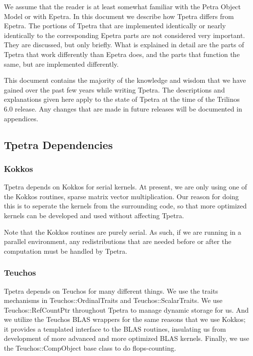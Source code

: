 \documentclass[10pt,relax]{TpetraDesign}
\begin{document}
We assume that the reader is at least somewhat familiar with the Petra Object Model or with Epetra. In this document we describe how Tpetra differs from Epetra. The portions of Tpetra that are implemented identically or nearly identically to the corresponding Epetra parts are not considered very important. They are discussed, but only briefly. What is explained in detail are the parts of Tpetra that work differently than Epetra does, and the parts that function the same, but are implemented differently.

This document contains the majority of the knowledge and wisdom that we have gained over the past few years while writing Tpetra. The descriptions and explanations given here apply to the state of Tpetra at the time of the Trilinos 6.0 release. Any changes that are made in future releases will be documented in appendices.

%
\subsection{Tpetra Dependencies}

\subsubsection*{Kokkos}
Tpetra depends on Kokkos \cite{Kokkos} for serial kernels. At present, we are only using one of the Kokkos routines, sparse matrix vector multiplication. Our reason for doing this is to seperate the kernels from the surrounding code, so that more optimized kernels can be developed and used without affecting Tpetra.

Note that the Kokkos routines are purely serial. As such, if we are running in a parallel environment, any redistributions that are needed before or after the computation must be handled by Tpetra.

\subsubsection*{Teuchos}
Tpetra depends on Teuchos \cite{Teuchos} for many different things. We use the traits mechanisms in Teuchos::OrdinalTraits and Teuchos::ScalarTraits. We use Teuchos::RefCountPtr throughout Tpetra to manage dynamic storage for us. And we utilize the Teuchos BLAS wrappers for the same reasons that we use Kokkos; it provides a templated interface to the BLAS routines, insulating us from development of more advanced and more optimized BLAS kernels. Finally, we use the Teuchos::CompObject base class to do flops-counting.
\end{document}
